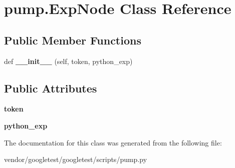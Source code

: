 \hypertarget{classpump_1_1ExpNode}{}\section{pump.\+Exp\+Node Class Reference}
\label{classpump_1_1ExpNode}
\subsection*{Public Member Functions}
\begin{DoxyCompactItemize}
\item 
def {\bfseries \+\_\+\+\_\+init\+\_\+\+\_\+} (self, token, python\+\_\+exp)\hypertarget{classpump_1_1ExpNode_a0808c394c4d3c8ac875005caa1b3e1b3}{}\label{classpump_1_1ExpNode_a0808c394c4d3c8ac875005caa1b3e1b3}

\end{DoxyCompactItemize}
\subsection*{Public Attributes}
\begin{DoxyCompactItemize}
\item 
{\bfseries token}\hypertarget{classpump_1_1ExpNode_ade05a5a32535d717dc5c194569aaf356}{}\label{classpump_1_1ExpNode_ade05a5a32535d717dc5c194569aaf356}

\item 
{\bfseries python\+\_\+exp}\hypertarget{classpump_1_1ExpNode_adccfe4778c2e34f6b2c88118c0f1587f}{}\label{classpump_1_1ExpNode_adccfe4778c2e34f6b2c88118c0f1587f}

\end{DoxyCompactItemize}


The documentation for this class was generated from the following file\+:\begin{DoxyCompactItemize}
\item 
vendor/googletest/googletest/scripts/pump.\+py\end{DoxyCompactItemize}
